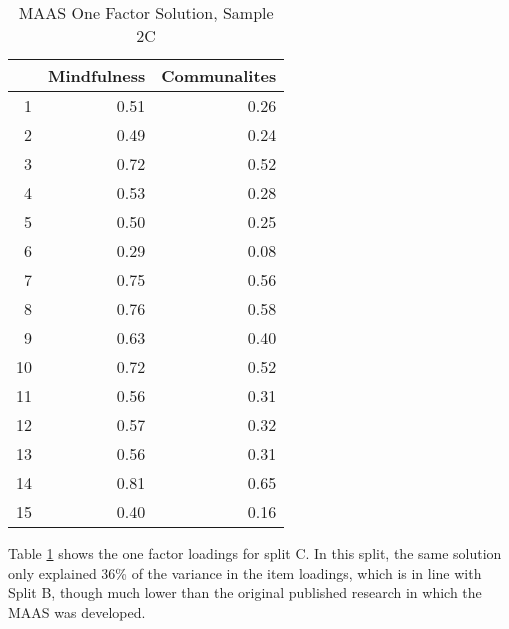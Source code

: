 \documentclass{article}
\begin{document}
\begin{table}[ht]
\centering
\begin{tabular}{rrr}
  \hline
 & Mindfulness & Communalites \\ 
  \hline
1 & 0.51 & 0.26 \\ 
  2 & 0.49 & 0.24 \\ 
  3 & 0.72 & 0.52 \\ 
  4 & 0.53 & 0.28 \\ 
  5 & 0.50 & 0.25 \\ 
  6 & 0.29 & 0.08 \\ 
  7 & 0.75 & 0.56 \\ 
  8 & 0.76 & 0.58 \\ 
  9 & 0.63 & 0.40 \\ 
  10 & 0.72 & 0.52 \\ 
  11 & 0.56 & 0.31 \\ 
  12 & 0.57 & 0.32 \\ 
  13 & 0.56 & 0.31 \\ 
  14 & 0.81 & 0.65 \\ 
  15 & 0.40 & 0.16 \\ 
   \hline
\end{tabular}
\caption{MAAS One Factor Solution, Sample 2C} 
\label{tab:maas2cfact1}
\end{table}
Table \ref{tab:maas2cfact1} shows the one factor loadings for split C. In this split, the same solution only explained 36\% of the variance in the item loadings, which is in line with Split B, though much lower than the original published research in which the MAAS was developed. 
\end{document}
